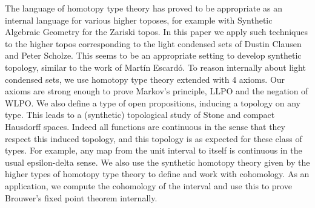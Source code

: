 The language of homotopy type theory has proved to be appropriate as an internal language for various higher toposes, 
for example with Synthetic Algebraic Geometry for the Zariski topos.
In this paper we apply such techniques to the higher topos corresponding to the light condensed sets 
of Dustin Clausen and Peter Scholze.
This seems to be an appropriate setting to develop synthetic topology, similar to the work of 
Martín Escardó.
To reason internally about light condensed sets, we use homotopy type theory extended with 4 axioms.
Our axioms are strong enough to prove Markov's principle, LLPO and the negation of WLPO. 
We also define a type of open propositions, inducing a topology on any type. 
This leads to a (synthetic) topological study of Stone and compact Hausdorff spaces. 
Indeed all functions are continuous in the sense that they respect this induced topology, 
and this topology is as expected for these class of types.
For example, any map from the unit interval to itself is continuous in the usual epsilon-delta sense.
We also use the synthetic homotopy theory 
given by the higher types of homotopy type theory to define and 
work with cohomology.
As an application, we compute the cohomology of the interval and use this to prove Brouwer's fixed point theorem
internally. 
